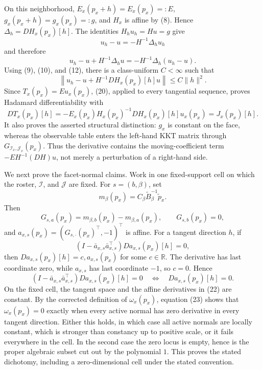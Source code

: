 On this neighborhood, \(E_x(p_x+h)=E_x(p_x)=:E\),
\(g_x(p_x+h)=g_x(p_x)=:g\), and \(H_x\) is affine by (8).  Hence
\(\Delta_h=DH_x(p_x)[h]\).  The identities \(H_hu_h=Hu=g\) give
\[
 u_h-u=-H^{-1}\Delta_hu_h
\]
and therefore
\[
 u_h-u+H^{-1}\Delta_hu=-H^{-1}\Delta_h(u_h-u).
\]
Using (9), (10), and (12), there is a class-uniform \(C<\infty\) such that
\[
 \left\|u_h-u+H^{-1}DH_x(p_x)[h]u\right\|
 \leq C\|h\|^2.
 \tag{20}
\]
Since \(T_x(p_x)=Eu_x(p_x)\), (20), applied to every tangential sequence,
proves Hadamard differentiability with
\[
 DT_x(p_x)[h]
 =-E_x(p_x)H_x(p_x)^{-1}DH_x(p_x)[h]u_x(p_x)
 =J_x(p_x)[h].
 \tag{21}
\]
It also proves the asserted structural distinction: \(g_x\) is constant on
the face, whereas the observable table enters the left-hand KKT matrix
through \(G_{\mathcal I_x,\mathcal J_x}(p_x)\).  Thus the derivative contains
the moving-coefficient term \(-E H^{-1}(DH)u\), not merely a perturbation of a
right-hand side.

We next prove the facet-normal claims.  Work in one fixed-support cell on
which the roster, \(\mathcal I\), and \(\mathcal J\) are fixed.  For
\(s=(b,\beta)\), set
\[
 m_\beta(p_x)=C_\beta\widetilde B_\beta^{-1}\widetilde p_x.
\]
Then
\[
 G_{s,a}(p_x)=m_{\beta,b}(p_x)-m_{\beta,a}(p_x),
 \qquad G_{s,b}(p_x)=0,
 \tag{22}
\]
and \(a_{x,s}(p_x)=(G_{s,\cdot}(p_x)^\top,-1)^\top\) is affine.  For a
tangent direction \(h\), if
\[
 (I-\bar a_{x,s}\bar a_{x,s}^\top)Da_{x,s}(p_x)[h]=0,
\]
then \(Da_{x,s}(p_x)[h]=c,a_{x,s}(p_x)\) for some \(c\in\mathbb R\).
The derivative has last coordinate zero, while \(a_{x,s}\) has last
coordinate \(-1\), so \(c=0\).  Hence
\[
 (I-\bar a_{x,s}\bar a_{x,s}^\top)Da_{x,s}(p_x)[h]=0
 \quad\Longleftrightarrow\quad
 Da_{x,s}(p_x)[h]=0.
 \tag{23}
\]
On the fixed cell, the tangent space and the affine derivatives in (22) are
constant.  By the corrected definition of \(\omega_x(p_x)\), equation (23)
shows that \(\omega_x(p_x)=0\) exactly when every active normal has zero
derivative in every tangent direction.  Either this holds, in which case all
active normals are locally constant, which is stronger than constancy up to
positive scale, or it fails everywhere in the cell.  In the second case the
zero locus is empty, hence is the proper algebraic subset cut out by the
polynomial \(1\).  This proves the stated dichotomy, including a
zero-dimensional cell under the stated convention.

